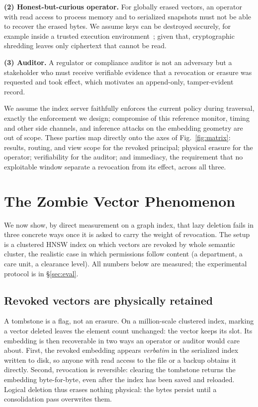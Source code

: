 \documentclass[sigconf, nonacm, review]{acmart}
\begin{document}
\noindent\textbf{(2) Honest-but-curious operator.} For globally erased
vectors, an operator with read access to process memory and to serialized
snapshots must not be able to recover the erased bytes. We assume keys can
be destroyed securely, for example inside a trusted execution
environment~\cite{DBLP:journals/corr/abs-2601-07004}; given that,
cryptographic shredding leaves only ciphertext that cannot be read.

\noindent\textbf{(3) Auditor.} A regulator or compliance auditor is not an
adversary but a stakeholder who must receive verifiable evidence that a
revocation or erasure was requested and took effect, which motivates an
append-only, tamper-evident record.

We assume the index server faithfully enforces the current policy during
traversal, exactly the enforcement we design; compromise of this
reference monitor, timing and other side channels, and inference attacks on
the embedding geometry are out of scope. These parties map directly onto
the axes of Fig.~\ref{fig:matrix}: results, routing, and view scope for the
revoked principal; physical erasure for the operator; verifiability for the
auditor; and immediacy, the requirement that no exploitable window separate
a revocation from its effect, across all three.

\section{The Zombie Vector Phenomenon}
\label{sec:phenomenon}
We now show, by direct measurement on a graph index, that lazy deletion
fails in three concrete ways once it is asked to carry the weight of
revocation. The setup is a clustered HNSW index on which vectors are
revoked by whole semantic cluster, the realistic case in which permissions
follow content (a department, a care unit, a clearance level). All numbers
below are measured; the experimental protocol is in \S\ref{sec:eval}.

\subsection{Revoked vectors are physically retained}
A tombstone is a flag, not an erasure. On a million-scale clustered index, marking a vector deleted leaves the
element count unchanged: the vector keeps its slot. Its embedding is then recoverable in two ways an
operator or auditor would care about. First, the revoked embedding appears
\emph{verbatim} in the serialized index written to disk, so anyone with
read access to the file or a backup obtains it directly. Second, revocation
is reversible: clearing the tombstone returns the embedding byte-for-byte,
even after the index has been saved and reloaded. Logical deletion thus
erases nothing physical: the bytes persist until a consolidation pass
overwrites them.
\end{document}
